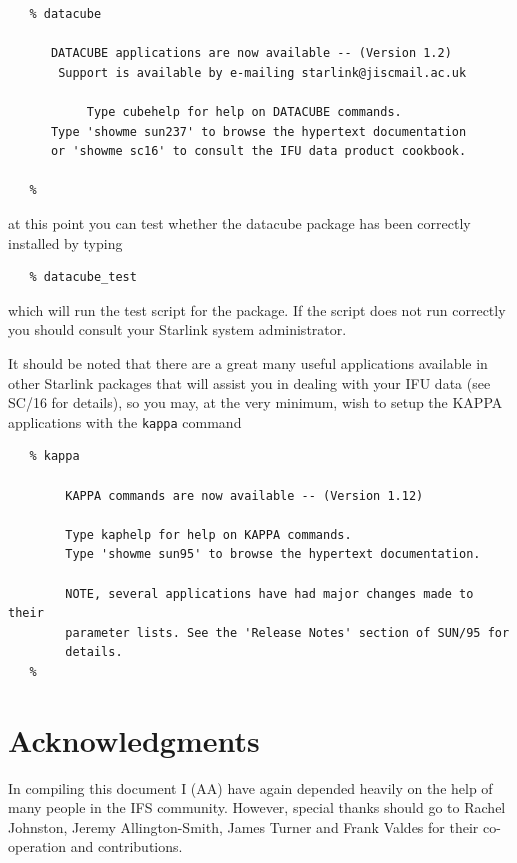 \documentclass[twoside,11pt]{article}
\newcommand{\htmladdnormallink}[2]{#1}
\newcommand{\xref}[3]{#1}
\newcommand{\xlabel}[1]{}
\renewcommand{\_}{\texttt{\symbol{95}}}
\begin{document}
\small\begin{verbatim}
   % datacube

      DATACUBE applications are now available -- (Version 1.2)
       Support is available by e-mailing starlink@jiscmail.ac.uk

           Type cubehelp for help on DATACUBE commands.
      Type 'showme sun237' to browse the hypertext documentation
      or 'showme sc16' to consult the IFU data product cookbook.

   %
\end{verbatim}\normalsize

at this point you can test whether the datacube package has been
correctly installed by typing

\small\begin{verbatim}
   % datacube_test
\end{verbatim}\normalsize

which will run the test script for the package. If the script does not
run correctly you should consult your Starlink system administrator.

It should be noted that there are a great many useful applications
available in other Starlink packages that will assist you in dealing
with your IFU data (see \xref{SC/16}{sc16}{} for details), so you may,
at the very minimum, wish to setup the \xref{KAPPA}{sun95}{}
applications with the {\tt kappa} command

\small\begin{verbatim}
   % kappa

        KAPPA commands are now available -- (Version 1.12)

        Type kaphelp for help on KAPPA commands.
        Type 'showme sun95' to browse the hypertext documentation.

        NOTE, several applications have had major changes made to their
        parameter lists. See the 'Release Notes' section of SUN/95 for
        details.
   %
\end{verbatim}\normalsize

\section*{\xlabel{sun237_acks}Acknowledgments\label{sun237_acks}}

In compiling this document I (AA) have again depended heavily on the help
of many people in the IFS community. However, special thanks should go
to \htmladdnormallink{Rachel
Johnston}{http://www.ast.cam.ac.uk/~raj/}, \htmladdnormallink{Jeremy
Allington-Smith}{http://star-www.dur.ac.uk:80/~jra/},
\htmladdnormallink{James Turner}{mailto:J.E.H.Turner@durham.ac.uk} and
\htmladdnormallink{Frank Valdes}{http://www.noao.edu/noao/scistaff/valdes.html} for their
co-operation and contributions.
\end{document}
